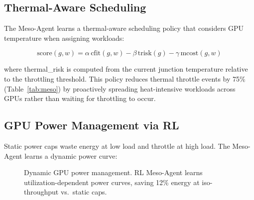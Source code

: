 \documentclass[conference,10pt]{IEEEtran}
\begin{document}
\subsection{Thermal-Aware Scheduling}

The Meso-Agent learns a thermal-aware scheduling policy that considers GPU temperature when assigning workloads:

\begin{equation}
\text{score}(g,w) = \alpha\,\text{cfit}(g,w) - \beta\,\text{trisk}(g) - \gamma\,\text{mcost}(g,w)
\end{equation}

where thermal\_risk is computed from the current junction temperature relative to the throttling threshold. This policy reduces thermal throttle events by 75\% (Table~\ref{tab:meso}) by proactively spreading heat-intensive workloads across GPUs rather than waiting for throttling to occur.

\subsection{GPU Power Management via RL}

Static power caps waste energy at low load and throttle at high load. The Meso-Agent learns a dynamic power curve:

\begin{figure}[!htbp]
\centering
{}
\caption{Dynamic GPU power management. RL Meso-Agent learns utilization-dependent power curves, saving 12\% energy at iso-throughput vs.\ static caps.}
\label{fig:power}
\end{figure}
\end{document}
